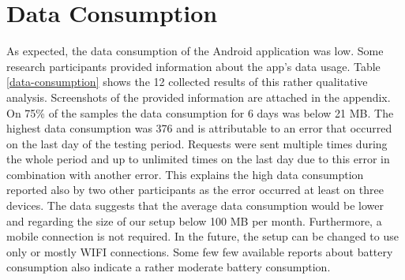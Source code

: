\section{Data Consumption}
As expected, the data consumption of the Android application was low. Some research participants provided information about the app's data usage. Table \ref{data-consumption} shows the 12 collected results of this rather qualitative analysis. Screenshots of the provided information are attached in the appendix. On 75\% of the samples the data consumption for 6 days was below 21 MB. The highest data consumption was 376 and is attributable to an error that occurred on the last day of the testing period. Requests were sent multiple times during the whole period and up to unlimited times on the last day due to this error in combination with another error. This explains the high data consumption reported also by two other participants as the error occurred at least on three devices. The data suggests that the average data consumption would be lower and regarding the size of our setup below 100 MB per month. Furthermore, a mobile connection is not required. In the future, the setup can be changed to use only or mostly WIFI connections.
Some few few available reports about battery consumption also indicate a rather moderate battery consumption.

